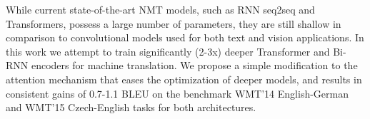 While current state-of-the-art NMT models, such as RNN seq2seq and Transformers, possess a large number of parameters, they are still shallow in comparison to convolutional models used for both text and vision applications. In this work we attempt to train significantly (2-3x) deeper Transformer and Bi-RNN encoders for machine translation.  We propose a simple modification to the attention mechanism that eases the optimization of deeper models, and results in consistent gains of 0.7-1.1 BLEU on the benchmark WMT'14 English-German and WMT'15 Czech-English tasks for both architectures.
